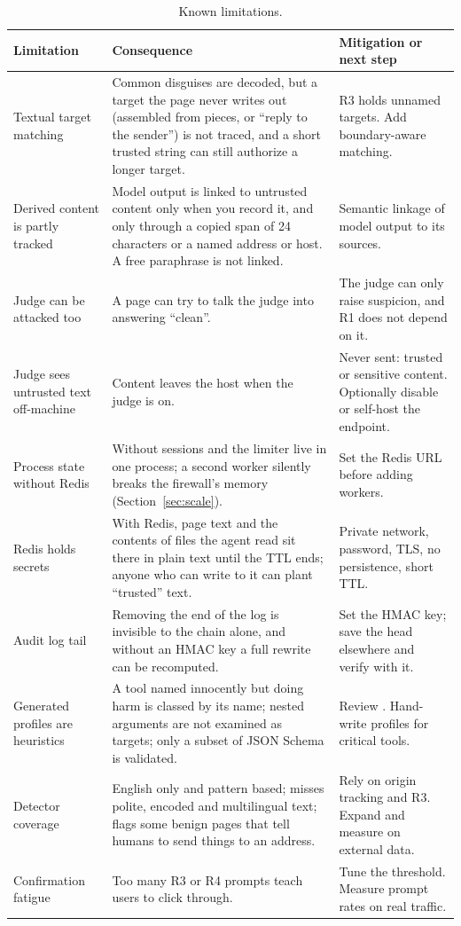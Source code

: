 \documentclass[11pt,a4paper]{article}
\newcommand{\code}[1]{\texttt{\detokenize{#1}}}
\begin{document}
\begin{table}[H]
\centering
\begin{tabularx}{\linewidth}{@{}>{\raggedright\arraybackslash}p{3.6cm}YY@{}}
\toprule
Limitation & Consequence & Mitigation or next step \\
\midrule
Textual target matching & Common disguises are decoded, but a target the page never writes out (assembled from pieces, or ``reply to the sender'') is not traced, and a short trusted string can still authorize a longer target. & R3 holds unnamed targets. Add boundary-aware matching. \\
Derived content is partly tracked & Model output is linked to untrusted content only when you record it, and only through a copied span of 24 characters or a named address or host. A free paraphrase is not linked. & Semantic linkage of model output to its sources. \\
Judge can be attacked too & A page can try to talk the judge into answering ``clean''. & The judge can only raise suspicion, and R1 does not depend on it. \\
Judge sees untrusted text off-machine & Content leaves the host when the judge is on. & Never sent: trusted or sensitive content. Optionally disable or self-host the endpoint. \\
Process state without Redis & Without \code{AGENTGUARD_REDIS_URL} sessions and the limiter live in one process; a second worker silently breaks the firewall's memory (Section~\ref{sec:scale}). & Set the Redis URL before adding workers. \\
Redis holds secrets & With Redis, page text and the contents of files the agent read sit there in plain text until the TTL ends; anyone who can write to it can plant ``trusted'' text. & Private network, password, TLS, no persistence, short TTL. \\
Audit log tail & Removing the end of the log is invisible to the chain alone, and without an HMAC key a full rewrite can be recomputed. & Set the HMAC key; save the head elsewhere and verify with it. \\
Generated profiles are heuristics & A tool named innocently but doing harm is classed by its name; nested arguments are not examined as targets; only a subset of JSON Schema is validated. & Review \code{GET /tools}. Hand-write profiles for critical tools. \\
Detector coverage & English only and pattern based; misses polite, encoded and multilingual text; flags some benign pages that tell humans to send things to an address. & Rely on origin tracking and R3. Expand and measure on external data. \\
Confirmation fatigue & Too many R3 or R4 prompts teach users to click through. & Tune the threshold. Measure prompt rates on real traffic. \\
\bottomrule
\end{tabularx}
\caption{Known limitations.}
\end{table}
\end{document}
